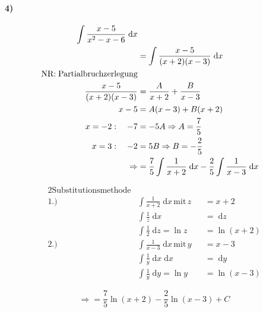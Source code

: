 \paragraph{4)}

\begin{align*}
    \int \frac{x-5}{x^2 - x - 6} \;\mathrm{d}x \\
    &= \int \frac{x-5}{(x+2)(x-3)} \;\mathrm{d}x \\
    \text{NR:\;Partialbruchzerlegung} \\
    \frac{x-5}{(x+2)(x-3)} &= \frac{A}{x+2} + \frac{B}{x-3} \\
    x-5 &= A(x-3) + B(x+2) \\
    x=-2:\quad -7 &= -5A \Rightarrow A = \frac{7}{5} \\
    x=3:\quad -2 &= 5B \Rightarrow B = -\frac{2}{5} \\
    \Rightarrow &= \frac{7}{5} \int \frac{1}{x+2} \;\mathrm{d}x - \frac{2}{5} \int \frac{1}{x-3} \;\mathrm{d}x
\end{align*}


\begin{alignat*}{2}
    \text{Substitutionsmethode} \\
    \text{1.)}\quad &\int \frac{1}{x+2} \;\mathrm{d}x \,\text{mit}\, z &&= x + 2 \\
    &\int \frac{1}{z} \;\mathrm{d}x &&= \;\mathrm{d}z \\
    &\int \frac{1}{2} \;\mathrm{d}z = \ln z &&= \ln (x + 2) \\
    \text{2.)}\quad &\int \frac{1}{x-3} \;\mathrm{d}x \,\text{mit}\, y &&= x - 3 \\
    &\int \frac{1}{y} \;\mathrm{d}x \;\mathrm{d}x &&= \;\mathrm{d}y \\
    &\int \frac{1}{y} \;\mathrm{d}y = \ln y &&= \ln(x-3)
\end{alignat*}

\[
    \Rightarrow = \frac{7}{5} \ln(x+2) - \frac{2}{5} \ln(x-3) + C 
\]
    